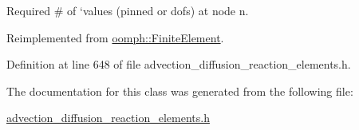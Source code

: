 Required \# of `values\textquotesingle{} (pinned or dofs) at node n. 



Reimplemented from \hyperlink{classoomph_1_1FiniteElement_a56610c60d5bc2d7c27407a1455471b1a}{oomph\+::\+Finite\+Element}.



Definition at line 648 of file advection\+\_\+diffusion\+\_\+reaction\+\_\+elements.\+h.



The documentation for this class was generated from the following file\+:\begin{DoxyCompactItemize}
\item 
\hyperlink{advection__diffusion__reaction__elements_8h}{advection\+\_\+diffusion\+\_\+reaction\+\_\+elements.\+h}\end{DoxyCompactItemize}
